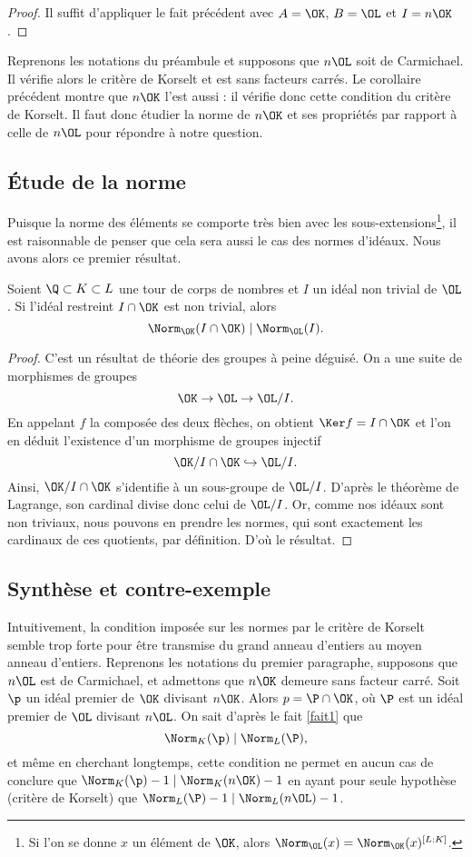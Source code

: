\documentclass[a4paper, 12pt, oneside]{article}
\begin{document}
\begin{proof}Il suffit d'appliquer le fait précédent avec $A=\OK$, $B=\OL$ et $I = n\OK$.
\end{proof}

Reprenons les notations du préambule et supposons que $n\OL$ soit de Carmichael. Il vérifie alors le critère de Korselt et est sans facteurs carrés. Le corollaire précédent montre que $n\OK$ l'est aussi : il vérifie donc cette condition du critère de Korselt. Il faut donc étudier la norme de $n\OK$ et ses propriétés par rapport à celle de $n\OL$ pour répondre à notre question.

\subsection{Étude de la norme}

Puisque la norme des éléments se comporte très bien avec les sous-extensions\footnote{Si l'on se donne $x$ un élément de $\OK$, alors $\Norm_{\OL}(x) = \Norm_{\OK}(x)^{[L : K]}$.}, il est raisonnable de penser que cela sera aussi le cas des normes d'idéaux. Nous avons alors ce premier résultat.

\begin{fait}\label{fait1} 
	Soient $\Q\subset K \subset L$ une tour de corps de nombres et $I$ un idéal non trivial de $\OL$. Si l'idéal restreint $I\cap \OK$ est non trivial, alors $$\Norm_{\OK}(I \cap \OK) \mid \Norm_{\OL}(I).$$
\end{fait}

\begin{proof}
C'est un résultat de théorie des groupes à peine déguisé. On a une suite de morphismes de groupes $$\OK\to \OL \to \OL/I.$$ En appelant $f$ la composée des deux flèches, on obtient $\Ker f = I\cap \OK$ et l'on en déduit l'existence d'un morphisme de groupes injectif $$\OK/I\cap \OK \hookrightarrow \OL/I.$$ Ainsi, $\OK/ I\cap \OK$ s'identifie à un sous-groupe de $\OL/I$. D'après le théorème de Lagrange, son cardinal divise donc celui de $\OL/I$. Or, comme nos idéaux sont non triviaux, nous pouvons en prendre les normes, qui sont exactement les cardinaux de ces quotients, par définition. D'où le résultat.
\end{proof}

\subsection{Synthèse et contre-exemple}

Intuitivement, la condition imposée sur les normes par le critère de Korselt semble trop forte pour être transmise du grand anneau d'entiers au moyen anneau d'entiers. Reprenons les notations du premier paragraphe, supposons que $n\OL$ est de Carmichael, et admettons que $n\OK$ demeure sans facteur carré. Soit $\p$ un idéal premier de $\OK$ divisant $n\OK$. Alors $p=\P\cap \OK$, où $\P$ est un idéal premier de $\OL$ divisant $n\OL$. On sait d'après le fait \ref{fait1} que $$\Norm_K(\p) \mid \Norm_L(\P),$$ et même en cherchant longtemps, cette condition ne permet en aucun cas de conclure que $\Norm_K(\p) - 1\mid \Norm_K(n\OK) - 1$ en ayant pour seule hypothèse (critère de Korselt) que $\Norm_L(\P) - 1 \mid \Norm_L(n\OL) - 1$. \\
\end{document}
